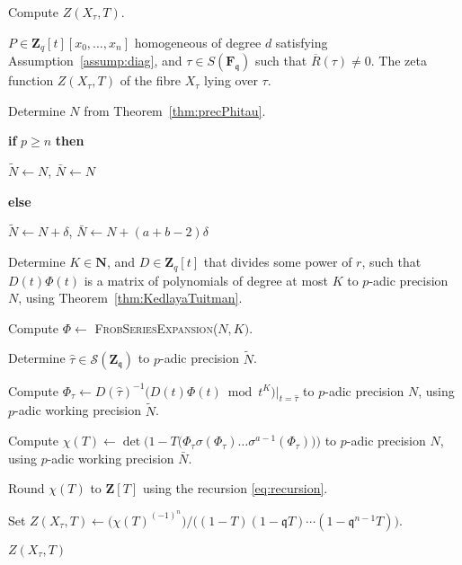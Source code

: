 \documentclass[a4paper,11pt]{article}
\numberwithin{equation}{section}
\newcommand{\NN}{\mathbf{N}} %
\newcommand{\ZZ}{\mathbf{Z}} %
\theoremstyle{definition}
\begin{document}
\begin{algorithm} 
\caption{Compute $Z(X_{\tau},T)$.}
\label{alg:complete}
\begin{algorithmic}
\vspace{1mm}
\Require $P \in \ZZ_q[t][x_0,\ldots,x_n]$ homogeneous of degree $d$ satisfying Assumption~\ref{assump:diag}, and $\tau \in S(\mathbf{F}_{\mathfrak{q}})$ such that $\overline{R}(\tau) \neq 0$.
\Ensure  The zeta function $Z(X_{\tau},T)$ of the fibre $X_{\tau}$ lying over $\tau$.
\State \begin{compactenum}[{\hspace{1em} } 1.] \vspace{-1.24em}
\item Determine $N$ from Theorem~\ref{thm:precPhitau}.
\item \textbf{if} $p \geq n$ \textbf{then} 
\item[] \hspace{1em} $\tilde{N} \gets N$, $\bar{N} \gets N$ 
\item[] \textbf{else}
\item[] \hspace{1em} $\tilde{N} \gets N + \delta$, $\bar{N} \gets N+(a+b-2) \delta$
\item Determine $K \in \NN$, and $D \in \ZZ_q[t]$ that divides some power of $r$, such that $D(t) \Phi(t)$ is a matrix 
      of polynomials of degree at most $K$ to $p$-adic precision $N$, using Theorem~\ref{thm:KedlayaTuitman}.
\item Compute $\Phi \gets$ \textsc{FrobSeriesExpansion($N,K)$}.
\item Determine $\hat{\tau} \in \mathcal{S}(\ZZ_{\mathfrak{q}})$ to $p$-adic precision $\tilde{N}$.
\item Compute $\Phi_{\tau} \gets D(\hat{\tau})^{-1} \bigl( D(t) \Phi(t) \bmod{t^{K}} \bigr)|_{t=\hat{\tau}}$ 
      to $p$-adic precision $N$, using $p$-adic working precision $\tilde{N}$.
\item Compute $\chi(T) \gets \det\bigl(1-T \bigl(\Phi_{\tau} \sigma(\Phi_{\tau}) \ldots \sigma^{a-1}(\Phi_{\tau}) \bigr)  \bigr)$ to $p$-adic precision $N$, 
      using $p$-adic working precision $\bar{N}$.
\item Round $\chi(T)$ to $\ZZ[T]$ using the recursion \eqref{eq:recursion}. 
\item Set $Z(X_{\tau},T) \gets \bigl( \chi(T)^{(-1)^n} \bigr)/\bigl((1 - T) (1 - \mathfrak{q}T) \dotsm (1 - \mathfrak{q}^{n-1}T)\bigr)$.
\item \Return $Z(X_{\tau},T)$
\end{compactenum}
\EndProcedure
\end{algorithmic}
\end{algorithm}
\end{document}
